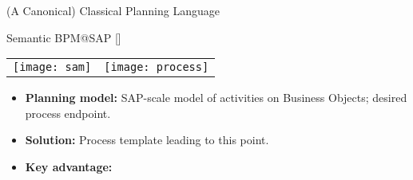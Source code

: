 \begin{frame}{(A Canonical) Classical Planning Language}
{%

}

\end{frame}


%
\begin{frame}{Semantic BPM@SAP \hfill \scriptsize [\cite{hoffmann:etal:jair-12}]}

{\small

\vspace{-0.5cm}

\begin{center}
\begin{tabular}{cc}
\texttt{[image: sam]} \hspace{0.2cm} & \texttt{[image: process]} 
\end{tabular}
\end{center}

\vspace{-0.2cm}

\begin{itemize}
\item \textbf{Planning model:} SAP-scale model of activities on
  Business Objects; desired process endpoint.
\item \textbf{Solution:} Process template leading to this point.
\item \textbf{Key advantage:} 
\end{itemize}

}

\medskip

\end{frame}


